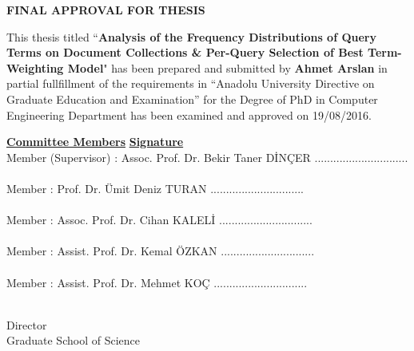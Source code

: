 %
%
%

\newpage
{}
\thispagestyle{empty}
\begin{center}
\textbf{FINAL APPROVAL FOR THESIS}
\end{center}

This thesis titled ``\textbf{Analysis of the Frequency Distributions of Query Terms on Document Collections \& Per-Query Selection of Best Term-Weighting Model}"
has been prepared and submitted by \textbf{Ahmet Arslan} in partial fullfillment of the requirements in ``Anadolu University Directive on Graduate Education and Examination'' for the Degree of PhD in Computer Engineering Department has been examined and approved on 19/08/2016.

\vspace*{4cm} { \noindent
\underline{\textbf{Committee Members}}  \hspace{80mm} \underline{\textbf{Signature}} \\

\noindent
Member (Supervisor) : Assoc. Prof. Dr. Bekir Taner D\.{I}N\c{C}ER     \hfill .............................. \\
\\
Member \hspace{2.23cm} : Prof. Dr. \"{U}mit Deniz TURAN    \hfill .............................. \\
\\
Member \hspace{2.23cm} : Assoc. Prof. Dr. Cihan KALEL\.{I}    \hfill .............................. \\
\\
Member \hspace{2.23cm} : Assist. Prof. Dr. Kemal \"{O}ZKAN    \hfill .............................. \\
\\
Member \hspace{2.23cm} : Assist. Prof. Dr. Mehmet KO\c{C}    \hfill .............................. \\
\\
} \vspace*{3.5cm}

\vspace{-1cm} 


\hspace*{9.9cm} Director \\
\hspace*{9.1cm} Graduate School of Science \\

	